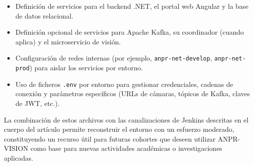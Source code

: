\begin{itemize}
    \item Definición de servicios para el backend .NET, el portal web Angular y la base de datos relacional.
    \item Definición opcional de servicios para Apache Kafka, su coordinador (cuando aplica) y el microservicio de visión.
    \item Configuración de redes internas (por ejemplo, \texttt{anpr-net-develop}, \texttt{anpr-net-prod}) para aislar los servicios por entorno.
    \item Uso de ficheros \texttt{.env} por entorno para gestionar credenciales, cadenas de conexión y parámetros específicos (URLs de cámaras, tópicos de Kafka, claves de JWT, etc.).
\end{itemize}

La combinación de estos archivos con las canalizaciones de Jenkins descritas
en el cuerpo del artículo permite reconstruir el entorno con un esfuerzo
moderado, constituyendo un recurso útil para futuras cohortes que deseen
utilizar ANPR-VISION como base para nuevas actividades académicas o
investigaciones aplicadas.
